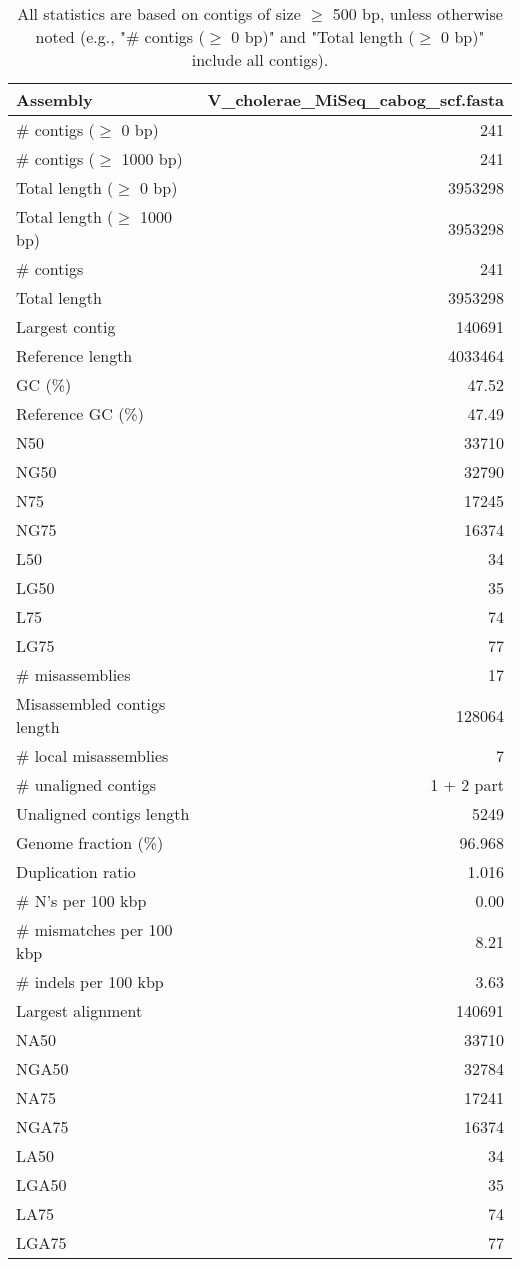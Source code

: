 \documentclass[12pt,a4paper]{article}
\begin{document}
\begin{table}[ht]
\begin{center}
\caption{All statistics are based on contigs of size $\geq$ 500 bp, unless otherwise noted (e.g., "\# contigs ($\geq$ 0 bp)" and "Total length ($\geq$ 0 bp)" include all contigs).}
\begin{tabular}{|l*{1}{|r}|}
\hline
Assembly & V\_cholerae\_MiSeq\_cabog\_scf.fasta \\ \hline
\# contigs ($\geq$ 0 bp) & 241 \\ \hline
\# contigs ($\geq$ 1000 bp) & 241 \\ \hline
Total length ($\geq$ 0 bp) & 3953298 \\ \hline
Total length ($\geq$ 1000 bp) & 3953298 \\ \hline
\# contigs & 241 \\ \hline
Total length & 3953298 \\ \hline
Largest contig & 140691 \\ \hline
Reference length & 4033464 \\ \hline
GC (\%) & 47.52 \\ \hline
Reference GC (\%) & 47.49 \\ \hline
N50 & 33710 \\ \hline
NG50 & 32790 \\ \hline
N75 & 17245 \\ \hline
NG75 & 16374 \\ \hline
L50 & 34 \\ \hline
LG50 & 35 \\ \hline
L75 & 74 \\ \hline
LG75 & 77 \\ \hline
\# misassemblies & 17 \\ \hline
Misassembled contigs length & 128064 \\ \hline
\# local misassemblies & 7 \\ \hline
\# unaligned contigs & 1 + 2 part \\ \hline
Unaligned contigs length & 5249 \\ \hline
Genome fraction (\%) & 96.968 \\ \hline
Duplication ratio & 1.016 \\ \hline
\# N's per 100 kbp & 0.00 \\ \hline
\# mismatches per 100 kbp & 8.21 \\ \hline
\# indels per 100 kbp & 3.63 \\ \hline
Largest alignment & 140691 \\ \hline
NA50 & 33710 \\ \hline
NGA50 & 32784 \\ \hline
NA75 & 17241 \\ \hline
NGA75 & 16374 \\ \hline
LA50 & 34 \\ \hline
LGA50 & 35 \\ \hline
LA75 & 74 \\ \hline
LGA75 & 77 \\ \hline
\end{tabular}
\end{center}
\end{table}
\end{document}

